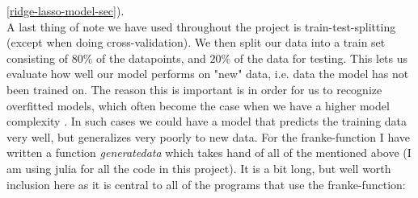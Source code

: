 \documentclass{article}
\begin{document}
\ref{ridge-lasso-model-sec}).
\\
A last thing of note we have used throughout the project is train-test-splitting
(except when doing cross-validation). We then split our data into a train set
consisting of $80\%$ of the datapoints, and $20\%$ of the data for testing.
This lets us evaluate how well our model performs on "new" data, i.e. data the
model has not been trained on. The reason this is important is in order for us
to recognize overfitted models, which often become the case when we have a
higher model complexity \cite[s.~7.2]{hastie2009elements}. In such cases we
could have a model that predicts the training data very well, but generalizes
very poorly to new data.  For the franke-function I have written a function
\textit{generatedata} which takes hand of all of the mentioned above (I am using
julia for all the code in this project). It is a bit long, but well worth
inclusion here as it is central to all of the programs that use the
franke-function:
\end{document}
